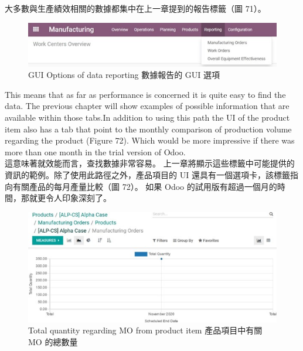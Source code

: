 \fontsize{12pt}{2.5pt}\selectfont
{大多數與生產績效相關的數據都集中在上一章提到的報告標籤（圖 71）。}\\[1pt]

\begin{figure}[hbt!]
\begin{center}
\includegraphics[width=15cm]{71}
\caption{\Large  GUI Options of data reporting 數據報告的 GUI 選項}\label{fig.71}
\end{center}
\end{figure}

\fontsize{12pt}{2.5pt}\selectfont 
{This means that as far as performance is concerned it is quite easy to find the data. The previous chapter will show examples of possible information that are available within those tabs.In addition to using this path the UI of the product item also has a tab that point to the monthly comparison of production volume regarding the product (Figure 72). Which would be more impressive if there was more than one month in the trial version of Odoo.}\\[1pt]

\fontsize{12pt}{2.5pt}\selectfont
{這意味著就效能而言，查找數據非常容易。 上一章將顯示這些標籤中可能提供的資訊的範例。除了使用此路徑之外，產品項目的 UI 還具有一個選項卡，該標籤指向有關產品的每月產量比較（圖 72）。 如果 Odoo 的試用版有超過一個月的時間，那就更令人印象深刻了。}\\[1pt]

\begin{figure}[hbt!]
\begin{center}
\includegraphics[width=15cm]{72}
\caption{\Large  Total quantity regarding MO from product item 產品項目中有關 MO 的總數量}\label{fig.72}
\end{center}
\end{figure}

